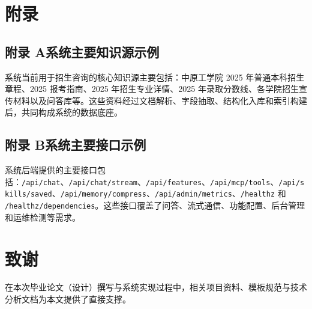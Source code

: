 \documentclass[UTF8,zihao=-4,oneside,fontset=windows]{ctexbook}
\numberwithin{equation}{chapter}
\begin{document}
\clearpage
\chapter*{附录}
{}

\section*{附录 A\quad 系统主要知识源示例}
{}
系统当前用于招生咨询的核心知识源主要包括：中原工学院 2025 年普通本科招生章程、2025 报考指南、2025 年招生专业详情、2025 年录取分数线、各学院招生宣传材料以及问答库等。这些资料经过文档解析、字段抽取、结构化入库和索引构建后，共同构成系统的数据底座。

\section*{附录 B\quad 系统主要接口示例}
{}
系统后端提供的主要接口包括：\texttt{/api/chat}、\texttt{/api/chat/stream}、\texttt{/api/features}、\texttt{/api/mcp/tools}、\texttt{/api/skills/saved}、\texttt{/api/memory/compress}、\texttt{/api/admin/metrics}、\texttt{/healthz} 和 \texttt{/healthz/dependencies}。这些接口覆盖了问答、流式通信、功能配置、后台管理和运维检测等需求。

\clearpage
\chapter*{致谢}
{}
在本次毕业论文（设计）撰写与系统实现过程中，相关项目资料、模板规范与技术分析文档为本文提供了直接支撑。
\end{document}
